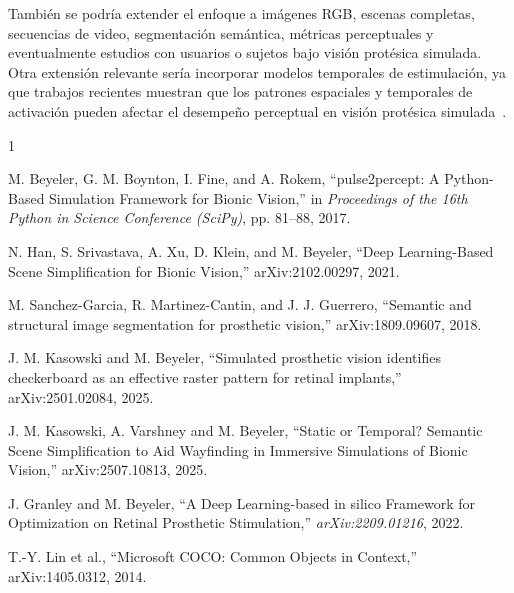 \documentclass[conference,a4paper]{IEEEtran}
\begin{document}
También se podría extender el enfoque a imágenes RGB, escenas completas, secuencias de video, segmentación semántica, métricas perceptuales y eventualmente estudios con usuarios o sujetos bajo visión protésica simulada. Otra extensión relevante sería incorporar modelos temporales de estimulación, ya que trabajos recientes muestran que los patrones espaciales y temporales de activación pueden afectar el desempeño perceptual en visión protésica simulada~\cite{kasowski2025}.



\begin{thebibliography}{1}

M. Beyeler, G. M. Boynton, I. Fine, and A. Rokem, ``pulse2percept: A Python-Based Simulation Framework for Bionic Vision,'' in \emph{Proceedings of the 16th Python in Science Conference (SciPy)}, pp. 81--88, 2017.

N. Han, S. Srivastava, A. Xu, D. Klein, and M. Beyeler, ``Deep Learning-Based Scene Simplification for Bionic Vision,'' arXiv:2102.00297, 2021.

M. Sanchez-Garcia, R. Martinez-Cantin, and J. J. Guerrero, ``Semantic and structural image segmentation for prosthetic vision,'' arXiv:1809.09607, 2018.

J. M. Kasowski and M. Beyeler, ``Simulated prosthetic vision identifies checkerboard as an effective raster pattern for retinal implants,'' arXiv:2501.02084, 2025.

J. M. Kasowski, A. Varshney and M. Beyeler, ``Static or Temporal? Semantic Scene Simplification to Aid Wayfinding in Immersive Simulations of Bionic Vision,'' arXiv:2507.10813, 2025.

J. Granley and M. Beyeler, ``A Deep Learning-based in silico Framework for Optimization on Retinal Prosthetic Stimulation,''  \textit{arXiv:2209.01216}, 2022.

T.-Y. Lin et al., ``Microsoft COCO: Common Objects in Context,'' arXiv:1405.0312, 2014.

\end{thebibliography}
\end{document}
